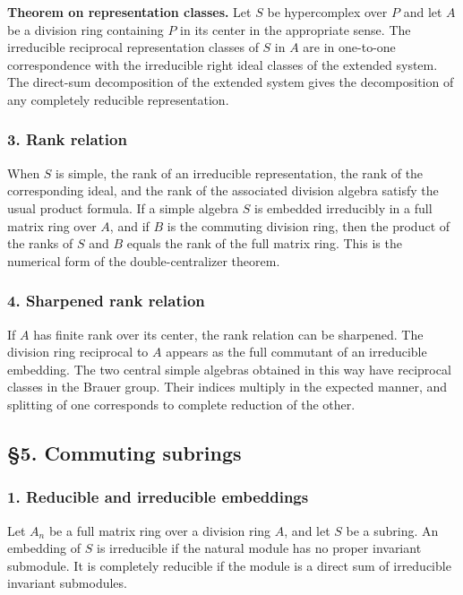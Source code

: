 \documentclass[11pt]{article}
\begin{document}
\textbf{Theorem on representation classes.} Let \(S\) be hypercomplex
over \(P\) and let \(A\) be a division ring containing \(P\) in its
center in the appropriate sense. The irreducible reciprocal
representation classes of \(S\) in \(A\) are in one-to-one
correspondence with the irreducible right ideal classes of the extended
system. The direct-sum decomposition of the extended system gives the
decomposition of any completely reducible representation.

\subsubsection{3. Rank relation}\label{rank-relation}

When \(S\) is simple, the rank of an irreducible representation, the
rank of the corresponding ideal, and the rank of the associated division
algebra satisfy the usual product formula. If a simple algebra \(S\) is
embedded irreducibly in a full matrix ring over \(A\), and if \(B\) is
the commuting division ring, then the product of the ranks of \(S\) and
\(B\) equals the rank of the full matrix ring. This is the numerical
form of the double-centralizer theorem.

\subsubsection{4. Sharpened rank
relation}\label{sharpened-rank-relation}

If \(A\) has finite rank over its center, the rank relation can be
sharpened. The division ring reciprocal to \(A\) appears as the full
commutant of an irreducible embedding. The two central simple algebras
obtained in this way have reciprocal classes in the Brauer group. Their
indices multiply in the expected manner, and splitting of one
corresponds to complete reduction of the other.

\subsection{§5. Commuting subrings}\label{commuting-subrings}

\subsubsection{1. Reducible and irreducible
embeddings}\label{reducible-and-irreducible-embeddings}

Let \(A_n\) be a full matrix ring over a division ring \(A\), and let
\(S\) be a subring. An embedding of \(S\) is irreducible if the natural
module has no proper invariant submodule. It is completely reducible if
the module is a direct sum of irreducible invariant submodules.
\end{document}
